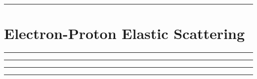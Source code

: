 
\noindent\rule{7in}{2.8pt}
\section{Electron-Proton Elastic Scattering}
    
\begin{problem}{7.0}

\end{problem}

\begin{solution}


\end{solution}

\noindent\rule{7in}{1.5pt}


\begin{problem}{7.1}

\end{problem}

\begin{solution}


\end{solution}

\noindent\rule{7in}{1.5pt}


\begin{problem}{7.2}

\end{problem}

\begin{solution}


\end{solution}

\noindent\rule{7in}{1.5pt}


\begin{problem}{7.3}

\end{problem}

\begin{solution}


\end{solution}

\noindent\rule{7in}{1.5pt}

